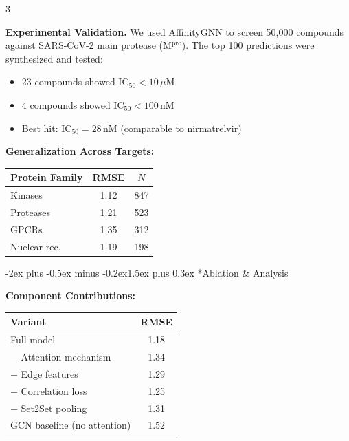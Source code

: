 \documentclass[a0paper,portrait]{article}
\makeatletter
\renewcommand{\section}{\@startsection{section}{1}{0pt}%
  {-2ex plus -0.5ex minus -0.2ex}{1.5ex plus 0.3ex}%
  {\fontsize{40}{48}\selectfont\bfseries\color{sectioncolor}}}
\newcommand{\posterbody}{\fontsize{28}{38}\selectfont}
\newcommand{\postertable}{\fontsize{26}{34}\selectfont}
\makeatother
\begin{document}
\begin{multicols}{3}
\vspace{2cm}

\textbf{Experimental Validation.} We used AffinityGNN to screen 50,000 compounds against SARS-CoV-2 main protease (M$^{\text{pro}}$). The top 100 predictions were synthesized and tested:
\begin{itemize}[leftmargin=1.5em, itemsep=10pt]
  \item 23 compounds showed IC$_{50} < 10\,\mu$M
  \item 4 compounds showed IC$_{50} < 100\,$nM
  \item Best hit: IC$_{50} = 28\,$nM (comparable to nirmatrelvir)
\end{itemize}

\vspace{2cm}

\textbf{Generalization Across Targets:}

\vspace{1cm}

\begin{center}
\renewcommand{\arraystretch}{1.6}
{\postertable
\begin{tabular}{@{}lcc@{}}
\toprule
\textbf{Protein Family} & \textbf{RMSE} & \textbf{$N$} \\
\midrule
Kinases        & 1.12 & 847 \\
Proteases      & 1.21 & 523 \\
GPCRs          & 1.35 & 312 \\
Nuclear rec.   & 1.19 & 198 \\
\bottomrule
\end{tabular}}
\end{center}

\columnbreak

\section*{Ablation \& Analysis}

\posterbody

\textbf{Component Contributions:}

\vspace{1cm}

\begin{center}
\renewcommand{\arraystretch}{1.6}
{\postertable
\begin{tabular}{@{}lc@{}}
\toprule
\textbf{Variant} & \textbf{RMSE} \\
\midrule
Full model                   & 1.18 \\
$-$ Attention mechanism      & 1.34 \\
$-$ Edge features            & 1.29 \\
$-$ Correlation loss         & 1.25 \\
$-$ Set2Set pooling          & 1.31 \\
GCN baseline (no attention)  & 1.52 \\
\bottomrule
\end{tabular}}
\end{center}


\end{multicols}
\end{document}
